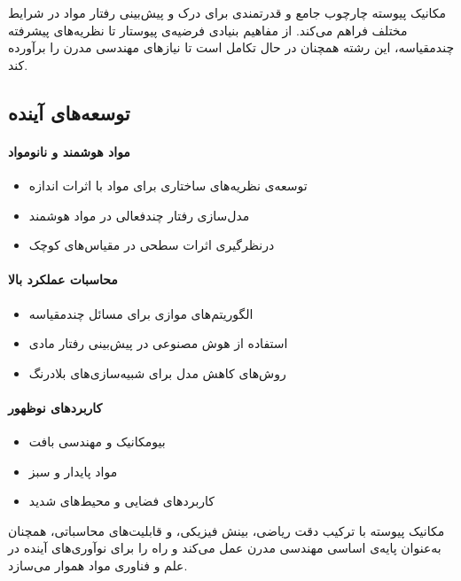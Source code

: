 مکانیک پیوسته چارچوب جامع و قدرتمندی برای درک و پیش‌بینی رفتار مواد در شرایط مختلف فراهم می‌کند. از مفاهیم بنیادی فرضیه‌ی پیوستار تا نظریه‌های پیشرفته چندمقیاسه، این رشته همچنان در حال تکامل است تا نیازهای مهندسی مدرن را برآورده کند.

\subsection{توسعه‌های آینده}

\paragraph{مواد هوشمند و نانومواد}
\begin{itemize}
	\item توسعه‌ی نظریه‌های ساختاری برای مواد با اثرات اندازه
	\item مدل‌سازی رفتار چندفعالی در مواد هوشمند
	\item درنظرگیری اثرات سطحی در مقیاس‌های کوچک
\end{itemize}

\paragraph{محاسبات عملکرد بالا}
\begin{itemize}
	\item الگوریتم‌های موازی برای مسائل چندمقیاسه
	\item استفاده از هوش مصنوعی در پیش‌بینی رفتار مادی
	\item روش‌های کاهش مدل برای شبیه‌سازی‌های بلادرنگ
\end{itemize}

\paragraph{کاربردهای نوظهور}
\begin{itemize}
	\item بیومکانیک و مهندسی بافت
	\item مواد پایدار و سبز
	\item کاربردهای فضایی و محیط‌های شدید
\end{itemize}

مکانیک پیوسته با ترکیب دقت ریاضی، بینش فیزیکی، و قابلیت‌های محاسباتی، همچنان به‌عنوان پایه‌ی اساسی مهندسی مدرن عمل می‌کند و راه را برای نوآوری‌های آینده در علم و فناوری مواد هموار می‌سازد.